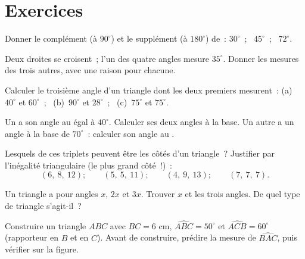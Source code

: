 \section{Exercices}

\begin{exercise}[$\star$]\label{exo:g7:triangles:1}
Donner le complément (à $90^\circ$) et le supplément (à $180^\circ$)
de~: $30^\circ$~; \ $45^\circ$~; \ $72^\circ$.
\end{exercise}

\begin{exercise}[$\star$]\label{exo:g7:triangles:2}
Deux droites se croisent~; l'un des quatre angles mesure $35^\circ$.
Donner les mesures des trois autres, avec une raison pour chacune.
\end{exercise}

\begin{exercise}[$\star$]\label{exo:g7:triangles:3}
Calculer le troisième angle d'un triangle dont les deux premiers
mesurent~: (a)~$40^\circ$ et $60^\circ$~; \
(b)~$90^\circ$ et $28^\circ$~; \
(c)~$75^\circ$ et $75^\circ$.
\end{exercise}

\begin{exercise}[$\star$]\label{exo:g7:triangles:4}
Un  a son angle au  égal à $40^\circ$. Calculer
ses deux angles à la base. Un autre  a un angle à la
base de $70^\circ$~: calculer son angle au \omterm{def:g5:solids:def}{sommet}.
\end{exercise}

\begin{exercise}[$\star$]\label{exo:g7:triangles:5}
Lesquels de ces triplets peuvent être les côtés d'un triangle~?
Justifier par l'inégalité triangulaire (le plus grand côté~!)~:
\[
(6,\ 8,\ 12); \qquad
(5,\ 5,\ 11); \qquad
(4,\ 9,\ 13); \qquad
(7,\ 7,\ 7).
\]
\end{exercise}

\begin{exercise}[$\star$]\label{exo:g7:triangles:6}
Un triangle a pour angles $x$, $2x$ et $3x$. Trouver $x$ et les trois
angles. De quel type de triangle s'agit-il~?
\end{exercise}

\begin{exercise}[$\star$]\label{exo:g7:triangles:7}
Construire un triangle $ABC$ avec $BC = 6$ cm,
$\widehat{ABC} = 50^\circ$ et $\widehat{ACB} = 60^\circ$ (rapporteur
en $B$ et en $C$). Avant de construire, prédire la mesure de
$\widehat{BAC}$, puis vérifier sur la figure.
\end{exercise}

